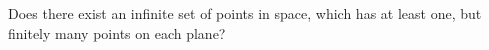 Does there exist an infinite set of points in space, which has at least one, but finitely many points on each plane?

